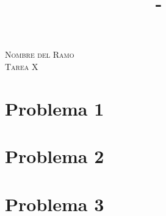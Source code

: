 \documentclass[letterpaper,12pt]{article}
\title{\Titulo - \Sigla \Ramo}
\author{\Name}
\newcommand{\Titulo}{
    Tarea X
}
\newcommand{\Ramo}{
    Nombre del Ramo
}
\begin{document}
\thispagestyle{empty}


\begin{center}
    \huge{\textsc{\Ramo\\ \Titulo}}
\end{center}

\vspace{1em}



\section*{Problema 1}
\vspace{0.8em}
    
\clearpage

\section*{Problema 2}
\vspace{0.8em}
    
\clearpage

\section*{Problema 3}
\vspace{0.8em}
    
\clearpage
\end{document}
